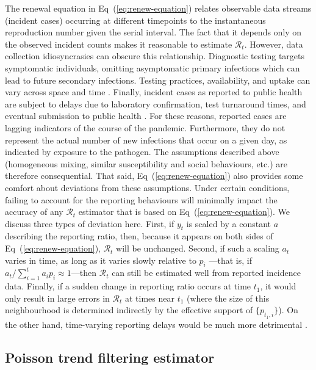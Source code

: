 \documentclass[10pt,letterpaper]{article}
\def\calR{\mathcal{R}}
\renewcommand{\eqref}[1]{Eq~(\ref{#1})}
\begin{document}
The renewal equation in \eqref{eq:renew-equation} relates observable data
streams (incident cases) occurring at different timepoints to the instantaneous
reproduction number given the serial interval. The fact that it depends only on
the observed incident counts makes it reasonable to estimate $\calR_t$. However,
data collection idiosyncrasies can obscure this relationship. Diagnostic testing
targets symptomatic individuals, omitting asymptomatic primary infections which
can lead to future secondary infections. Testing practices, availability, and
uptake can vary across space and time \cite{pitzer2021impact,
hitchings2021usefulness}. Finally, incident cases as reported to public health
are subject to delays due to laboratory confirmation, test turnaround times, and
eventual submission to public health \cite{pellis2021challenges}. For these
reasons, reported cases are lagging indicators of the course of the pandemic.
Furthermore, they do not represent the actual number of new infections that
occur on a given day, as indicated by exposure to the pathogen. The assumptions
described above (homogeneous mixing, similar susceptibility and social
behaviours, etc.) are therefore consequential. That said,
\eqref{eq:renew-equation} also provides some comfort about deviations from these
assumptions. Under certain conditions, failing to account for the reporting
behaviours will minimally impact the accuracy of any $\mathcal{R}_t$ estimator
that is based on \eqref{eq:renew-equation}. We discuss three types of deviation
here. First, if $y_t$ is scaled by a constant $a$ describing the reporting
ratio, then, because it appears on both sides of \eqref{eq:renew-equation},
$\calR_t$ will be unchanged. Second, if such a scaling $a_t$ varies in time, as
long as it varies slowly relative to $p_i$ ---that is, if $a_t / \sum_{i = 1}^t
a_i p_i \approx 1$---then $\calR_t$ can still be estimated well from reported
incidence data. Finally, if a sudden change in reporting ratio occurs at time
$t_1$, it would only result in large errors in $\calR_t$ at times near $t_1$
(where the size of this neighbourhood is determined indirectly by the effective
support of $\{p_{t_1,i}\}$). On the other hand, time-varying reporting delays
would be much more detrimental \cite{EALES2024100742,park2024estimating}.


\subsection{Poisson trend filtering estimator} 
\end{document}
